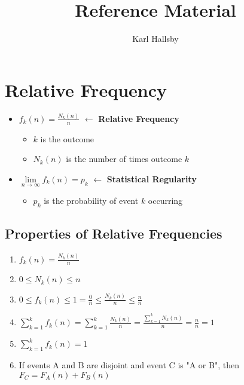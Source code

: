 \documentclass[10pt,letterpaper,final,twoside,notitlepage]{article}
\author{Karl Hallsby}
\title{Reference Material}
\theoremstyle{plain}
\theoremstyle{definition}
\begin{document}
\section{Relative Frequency} \label{sec:Relative Frequency}
\begin{itemize}[noitemsep, nolistsep]
	\item $f_k (n) = \frac{N_k (n)}{n}$ $\leftarrow$ {\large \textbf{Relative Frequency}}
	\begin{itemize}[noitemsep, nolistsep]
		\item $k$ is the outcome
		\item $N_k (n)$ is the number of times outcome $k$
	\end{itemize}
	\item $\lim\limits_{n \rightarrow \infty} f_k (n) = p_k$ $\leftarrow$ {\large \textbf{Statistical Regularity}}
	\begin{itemize}[noitemsep, nolistsep]
		\item $p_k$ is the probability of event $k$ occurring
	\end{itemize}
\end{itemize}

	\subsection{Properties of Relative Frequencies} \label {subsec:Properties Relative Frequency}
	\begin{enumerate}
		\item $f_k (n) = \frac{N_k (n)}{n}$
		\item $0 \leq N_k (n) \leq n$
		\item $0 \leq f_k (n) \leq 1 = \frac{0}{n} \leq \frac{N_k (n)}{n} \leq \frac{n}{n}$
		\item $\sum_{k=1}^{k} f_k (n) = \sum_{k=1}^{k} \frac{N_k (n)}{n} = \frac{\sum_{k=1}^{k} N_k (n)}{n} = \frac{n}{n} = 1$
		\item $\sum_{k=1}^{k} f_k (n) = 1$
		\item If events A and B are disjoint and event C is "A or B", then $F_C = F_A (n) + F_B (n)$
	\end{enumerate}
\end{document}
